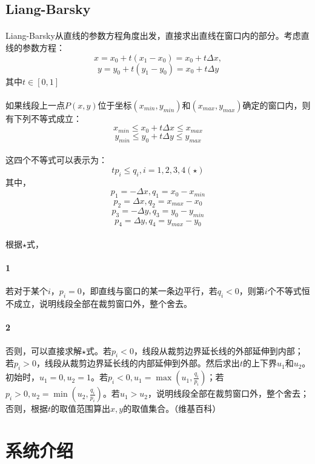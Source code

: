 \documentclass[a4paper,UTF8]{article}
\theoremstyle{definition}
\begin{document}
\subsection{Liang-Barsky}

\paragraph{}Liang-Barsky从直线的参数方程角度出发，直接求出直线在窗口内的部分。考虑直线的参数方程：\\
$$x=x_0+t(x_1-x_0)=x_0+t\Delta x,$$
$$y=y_0+t(y_1-y_0)=x_0+t\Delta y$$
其中$t\in [0,1]$
\paragraph{}如果线段上一点$P(x,y)$位于坐标$(x_{min},y_{min})$和$(x_{max},y_{max})$确定的窗口内，则有下列不等式成立：\\
$$x_{min}\le x_0+t\Delta x\le x_{max}$$
$$y_{min}\le y_0+t\Delta y\le y_{max}$$
\paragraph{}这四个不等式可以表示为：
$$tp_i\le q_i, i=1,2,3,4(\star)$$
其中，\\
$$p_1=-\Delta x,q_1=x_0-x_{min}$$
$$p_2=\Delta x,q_2=x_{max}-x_{0}$$
$$p_3=-\Delta y,q_3=y_0-y_{min}$$
$$p_4=\Delta y,q_4=y_{max}-y_{0}$$
\paragraph{} 根据$\star$式，\\
\paragraph{1} 若对于某个$i$，$p_i=0$，即直线与窗口的某一条边平行，若$q_i<0$，则第$i$个不等式恒不成立，说明线段全部在裁剪窗口外，整个舍去。
\paragraph{2} 否则，可以直接求解$\star$式。若$p_i<0$，线段从裁剪边界延长线的外部延伸到内部；若$p_i>0$，线段从裁剪边界延长线的内部延伸到外部。然后求出$t$的上下界$u_1$和$u_2$。初始时，$u_1=0,u_2=1$。若$p_i<0,u_1=\max(u_1,\frac{q_i}{p_i})$；若$p_i>0,u_2=\min(u_2,\frac{q_i}{p_i})$。若$u_1>u_2$，说明线段全部在裁剪窗口外，整个舍去；否则，根据$t$的取值范围算出$x,y$的取值集合。（维基百科）
\section{系统介绍}
\end{document}
